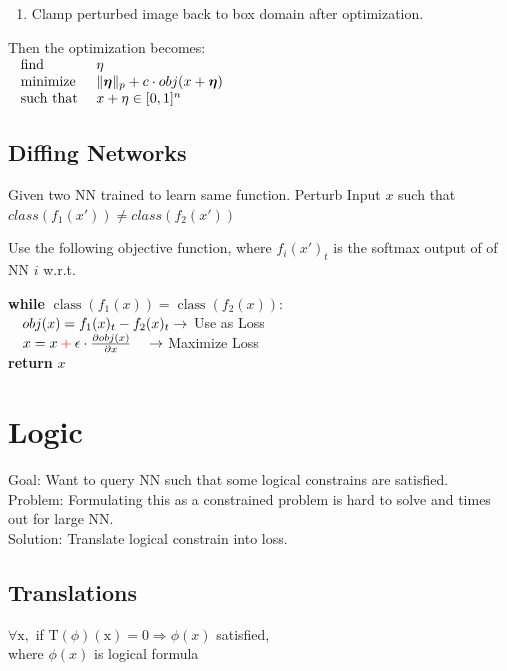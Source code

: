 \documentclass[11pt]{extarticle}
\begin{document}
\begin{multicols*}{3}
\begin{enumerate}[leftmargin=*]
            \item
            Clamp perturbed image back to box domain after optimization.
            \end{enumerate}
            Then the optimization becomes:\\
            $\begin{array} { l l } { \text { find } } & { \eta } \\ { \text { minimize } } & { \| \boldsymbol { \eta } \| _ { p } + c \cdot o b j ( x + \boldsymbol { \eta } ) } \\ { \text { such that } } & { x + \eta \in [ 0,1 ] ^ { n } } \end{array}$
            
            \subsection*{Diffing Networks}
            Given two NN trained to learn same function. Perturb Input $x$ such that $class(f_1(x')) \neq class(f_2(x'))$ 
            
            Use the following objective function, where $f_i(x')_t$ is the softmax output of of NN $i$ w.r.t. 
            
            \textbf{while} $\operatorname { class } \left( f _ { 1 } ( x ) \right) = \operatorname { class } \left( f _ { 2 } ( x ) \right) :$\\
            $\null \quad o b j ( x ) = f _ { 1 } ( x ) _ { t } - f _ { 2 } ( x ) _ { t } \rightarrow$ Use as Loss\\
            $\null \quad x = x \mathbin{\textcolor{red}{ + }} \epsilon \cdot \frac { \partial o b j ( x ) } { \partial x } \quad \rightarrow $ {\color{red} Maximize } Loss\\
            \textbf{return} $x$
        
        \newpage
		\section{Logic}
		    Goal: Want to query NN such that some logical constrains are satisfied.\\
		    Problem: Formulating this as a constrained problem is hard to solve and times out for large NN.\\
		    Solution: Translate logical constrain into loss.
			\subsection*{Translations}
			$\forall \mathrm { x } ,$ if $\mathrm { T } ( \phi ) ( \mathrm { x } ) = 0 \Rightarrow \phi(x)$ satisfied, \\where $\phi(x)$ is logical formula
			

\end{multicols*}
\end{document}
